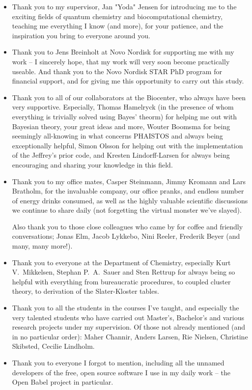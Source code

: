 \begin{itemize}
\item Thank you to my supervisor, Jan "Yoda" Jensen for introducing me to the
    exciting fields of quantum chemistry and biocomputational chemistry, teaching me everything I know (and more), for your patience, and the inspiration you bring to everyone around you.

\item Thank you to Jens Breinholt at Novo Nordisk for supporting me with my work -- I sincerely hope, that my work will very soon become practically useable. And thank you to the Novo Nordisk STAR PhD program for financial support, and for giving me this opportunity to carry out this study.

\item Thank you to all of our collaborators at the Biocenter, who always have been very supportive. Especially, Thomas Hamelryck (in the presence of whom everything is trivially solved using Bayes' theorm) for helping me out with Bayesian theory, your great ideas and more, Wouter Boomsma for being seemingly all-knowing in what concerns PHAISTOS and always being exceptionally helpful, Simon Olsson for helping out with the implementation of the Jeffrey's prior code, and Kresten Lindorff-Larsen for always being encouraging and sharing your knowledge in this field.

\item Thank you to my office mates, Casper Steinmann, Jimmy Kromann and Lars Bratholm, for the invaluable company, our office pranks, and endless number of energy drinks consumed, as well as the highly valuable scientific discussions we continue to share daily (not forgetting the virtual monster we've slayed).

Also thank you to those close colleagues who came by for coffee and friendly conversations; Jonas Elm, Jacob Lykkebo, Nini Reeler, Frederik Beyer (and many, many more!).

\item Thank you to everyone at the Department of Chemistry, especially Kurt V.~Mikkelsen, Stephan P.~A.~Sauer and Sten Rettrup for always being so helpful with everything from bureaucratic procedures, to coupled cluster theory, to derivation of the Slater-Kloster tables.

\item Thank you to all the students in the courses I've taught, and especially the very talented students who have carried out Master's, Bachelor's and various research projects under my supervision. Of those not already mentioned (and in no particular order): Maher Channir, Anders Larsen, Rie Nielsen, Christine Skibsted, Cecilie Lindholm.

\item Thank you to everyone I forgot to mention, including all the unnamed developers of the free, open source software I use in my daily work -- the Open Babel project in particular.

\end{itemize}
